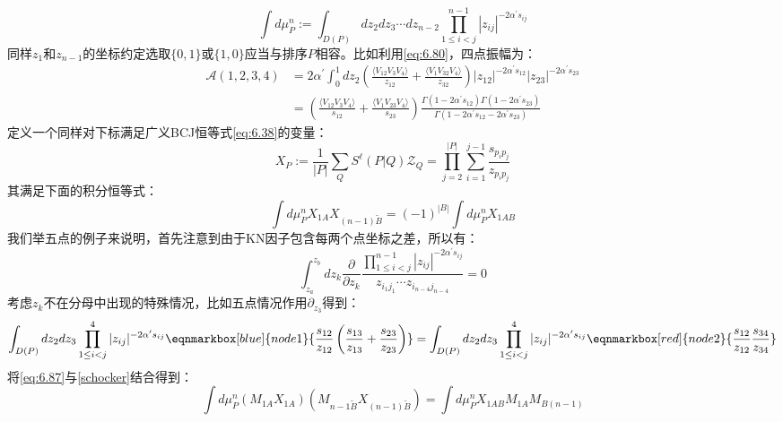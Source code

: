 \begin{equation}
	\int d\mu_P^n:=\int_{D(P)}dz_2dz_3\cdots dz_{n-2}\prod_{1\leq i<j}^{n-1}|z_{ij}|^{-2\alpha^{\prime}s_{ij}}
\end{equation}
同样$z_1$和$z_{n-1}$的坐标约定选取$\{0,1\}$或$\{1,0\}$应当与排序$P$相容。比如利用\ref{eq:6.80}，四点振幅为：
\begin{equation}
	\begin{aligned}
		\mathcal{A}(1,2,3,4)&=2\alpha^{\prime}\int_0^1dz_2\left(\frac{\langle V_{12}V_3V_4\rangle}{z_{12}}+\frac{\langle V_1V_{32}V_4\rangle}{z_{32}}\right)|z_{12}|^{-2\alpha^{\prime}s_{12}}|z_{23}|^{-2\alpha^{\prime}s_{23}}\\&=\left(\frac{\langle V_{12}V_3V_4\rangle}{s_{12}}+\frac{\langle V_1V_{23}V_4\rangle}{s_{23}}\right)\frac{\Gamma(1-2\alpha^{\prime}s_{12})\Gamma(1-2\alpha^{\prime}s_{23})}{\Gamma(1-2\alpha^{\prime}s_{12}-2\alpha^{\prime}s_{23})}
	\end{aligned}
\end{equation}
定义一个同样对下标满足广义BCJ恒等式\ref{eq:6.38}的变量：
\begin{equation}
	X_{P}:=\frac{1}{|P|}\sum_{ {Q}}S^{\ell}(P| {Q})\mathcal{Z}_{ {Q}}=\prod_{j=2}^{|P|}\sum_{i=1}^{j-1}\frac{s_{p_ip_j}}{z_{p_ip_j}}
\end{equation}
其满足下面的积分恒等式：
\begin{equation}
	\label{eq:6.87}
	\int d\mu_P^nX_{1A}X_{(n-1)\tilde{B}}=(-1)^{|B|}\int d\mu_P^nX_{1AB}
\end{equation}
我们举五点的例子来说明，首先注意到由于KN因子包含每两个点坐标之差，所以有：
\begin{equation}
	\int_{z_a}^{z_b}dz_k\frac{\partial}{\partial z_k}\frac{\prod_{1\leq i<j}^{n-1}|z_{ij}|^{-2\alpha^{\prime}s_{ij}}}{z_{i_1j_1}\cdots z_{i_{n-4}j_{n-4}}}=0
\end{equation}
考虑$z_k$不在分母中出现的特殊情况，比如五点情况作用$\partial_{z_3}$得到：
\begin{equation}
	\int_{D(P)}dz_2dz_3\prod_{1\leq i<j}^4|z_{ij}|^{-2\alpha^{\prime}s_{ij}}
	\eqnmarkbox[blue]{node1}{\frac{s_{12}}{z_{12}}\left(\frac{s_{13}}{z_{13}}+\frac{s_{23}}{z_{23}}\right)}
	=\int_{D(P)}dz_2dz_3\prod_{1\leq i<j}^4|z_{ij}|^{-2\alpha^{\prime}s_{ij}}
	\eqnmarkbox[red]{node2}{\frac{s_{12}}{z_{12}}\frac{s_{34}}{z_{34}}}
\end{equation}
将\ref{eq:6.87}与\ref{schocker}结合得到：
\begin{equation}
	\int d\mu_P^n(M_{1A}X_{1A})(M_{n-1\tilde{B}}X_{(n-1)\tilde{B}})=\int d\mu_P^nX_{1AB}M_{1A}M_{B(n-1)}
\end{equation}
